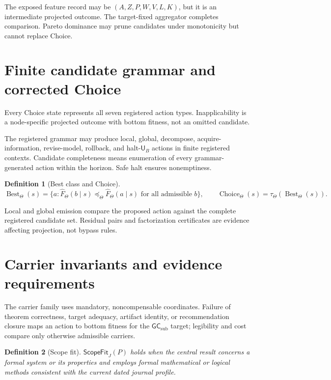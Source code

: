 \documentclass[10pt]{article}
\newtheorem{definition}{Definition}[section]
\newcommand{\Choice}{\operatorname{Choice}}
\newcommand{\Best}{\operatorname{Best}}
\newcommand{\UB}{\mathsf{U}_B}
\newcommand{\Target}{\Theta}
\newcommand{\ProjFit}{\widehat F}
\newcommand{\GCsub}{\mathsf{GC}_{\mathrm{sub}}}
\begin{document}
The exposed feature record may be $(A,Z,P,W,V,L,K)$, but it is an intermediate projected outcome.  The target-fixed aggregator completes comparison.  Pareto dominance may prune candidates under monotonicity but cannot replace Choice.

\section{Finite candidate grammar and corrected Choice}

Every Choice state represents all seven registered action types.  Inapplicability is a node-specific projected outcome with bottom fitness, not an omitted candidate.


The registered grammar may produce local, global, decompose, acquire-information, revise-model, rollback, and halt-$\UB$ actions in finite registered contexts.  Candidate completeness means enumeration of every grammar-generated action within the horizon.  Safe halt ensures nonemptiness.

\begin{definition}[Best class and Choice]
\[
\Best_\Target(s)=\{a:\ProjFit_\Target(b\mid s)\preceq_\Target
\ProjFit_\Target(a\mid s)\text{ for all admissible }b\},
\qquad
\Choice_\Target(s)=\tau_\Target(\Best_\Target(s)).
\]
\end{definition}

Local and global emission compare the proposed action against the complete registered candidate set.  Residual pairs and factorization certificates are evidence affecting projection, not bypass rules.


\section{Carrier invariants and evidence requirements}

The carrier family uses mandatory, noncompensable coordinates.  Failure of theorem correctness, target adequacy, artifact identity, or recommendation closure maps an action to bottom fitness for the $\GCsub$ target; legibility and cost compare only otherwise admissible carriers.

\begin{definition}[Scope fit]
$\mathsf{ScopeFit}_J(P)$ holds when the central result concerns a formal system or its properties and employs formal mathematical or logical methods consistent with the current dated journal profile.
\end{definition}
\end{document}
